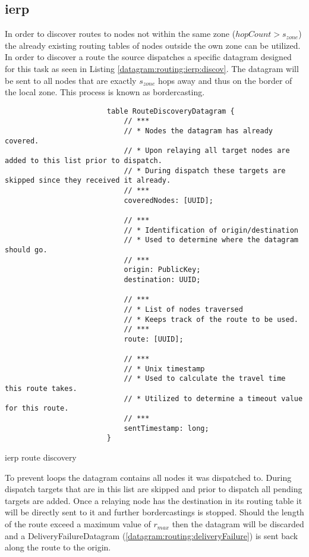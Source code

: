 \documentclass[a4paper]{report}
\begin{document}
            \subsection[\acrshort{ierp}]{\acrlong{ierp}}\label{section:routing:ierp}
                In order to discover routes to nodes not within the same zone ($hopCount > s_{zone}$) the already existing routing tables of nodes outside the own zone can be utilized. In order to discover a route the source dispatches a specific \gls{datagram} designed for this task as seen in Listing \ref{datagram:routing:ierp:discov}. The \gls{datagram} will be sent to all nodes that are exactly $s_{zone}$ hops away and thus on the border of the local zone. This process is known as \Gls{bordercasting}.
	            \begin{listing}
	                \begin{verbatim}
                        table RouteDiscoveryDatagram {
                            // ***
                            // * Nodes the datagram has already covered.
                            // * Upon relaying all target nodes are added to this list prior to dispatch.
                            // * During dispatch these targets are skipped since they received it already.
                            // ***
                            coveredNodes: [UUID];
                        
                            // ***
                            // * Identification of origin/destination
                            // * Used to determine where the datagram should go.
                            // ***
                            origin: PublicKey;
                            destination: UUID;
                        
                            // ***
                            // * List of nodes traversed
                            // * Keeps track of the route to be used.
                            // ***
                            route: [UUID];
                        
                            // ***
                            // * Unix timestamp
                            // * Used to calculate the travel time this route takes.
                            // * Utilized to determine a timeout value for this route.
                            // ***
                            sentTimestamp: long;
                        }
	                \end{verbatim}
	                \caption{\acrshort{ierp} route discovery}
	                \label{datagram:routing:ierp:discov}
	            \end{listing}
	            To prevent loops the \gls{datagram} contains all nodes it was dispatched to. During dispatch targets that are in this list are skipped and prior to dispatch all pending targets are added. Once a relaying node has the destination in its routing table it will be directly sent to it and further \glspl{bordercasting} is stopped. Should the length of the route exceed a maximum value of $r_{max}$ then the datagram will be discarded and a DeliveryFailureDatagram (\ref{datagram:routing:deliveryFailure}) is sent back along the route to the origin.
                
\end{document}
